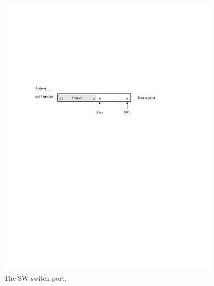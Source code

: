 \documentclass[epsfig,10pt,fullpage]{article}
\begin{document}
\begin{figure}[htb]
	\begin{center}
	\includegraphics[scale=1]{figures/fig_slider_port.pdf}
	\end{center}
	\caption{The SW switch port.}
\label{fig:SW}
\end{figure}
\end{document}
